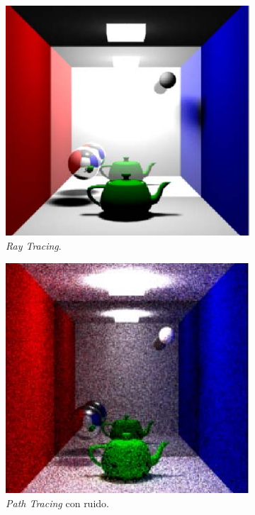 \documentclass[titlepage,12pt]{report}
\begin{document}
\begin{figure}[H]
	\centering
	\begin{subfigure}{.3\textwidth}
		\centering
		\includegraphics[width=.8\textwidth]{media/RayTracing.png}
		\caption{\textit{Ray Tracing}.}
		\label{RT}
	\end{subfigure}
	\begin{subfigure}{.3\textwidth}
		\centering
		\includegraphics[width=.8\textwidth]{media/PathTracing.png}
		\caption{\textit{Path Tracing} con ruido.}
		\label{PTN}
	\end{subfigure}
	\begin{subfigure}{.3\textwidth}
		\centering

\end{subfigure}
\end{figure}
\end{document}
